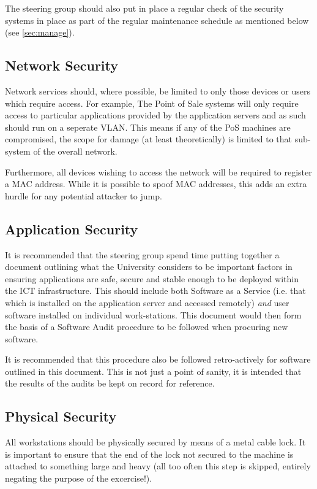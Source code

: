 \documentclass[a4paper, twoside]{article}
\begin{document}
The steering group should also put in place a regular check of the security
systems in place as part of the regular maintenance schedule as mentioned below
(see \ref{sec:manage}).

\subsection{Network Security}
Network services should, where possible, be limited to only those devices or
users which require access. For example, The Point of Sale systems will only
require access to particular applications provided by the application servers
and as such should run on a seperate VLAN. This means if any of the PoS
machines are compromised, the scope for damage (at least theoretically) is
limited to that sub-system of the overall network.

Furthermore, all devices wishing to access the network will be required to
register a MAC address. While it is possible to spoof MAC addresses, this adds
an extra hurdle for any potential attacker to jump.

\subsection{Application Security}
It is recommended that the steering group spend time putting together a document
outlining what the University considers to be important factors in ensuring
applications are safe, secure and stable enough to be deployed within the ICT
infrastructure. This should include both Software as a Service (i.e. that which
is installed on the application server and accessed remotely) \emph{and} user
software installed on individual work-stations. This document would then form
the basis of a Software Audit procedure to be followed when procuring new
software.

It is recommended that this procedure also be followed retro-actively for
software outlined in this document. This is not just a point of sanity, it is
intended that the results of the audits be kept on record for reference.

\subsection{Physical Security}
All workstations should be physically secured by means of a metal cable lock. It
is important to ensure that the end of the lock not secured to the machine is
attached to something large and heavy (all too often this step is skipped,
entirely negating the purpose of the excercise!).
\end{document}
